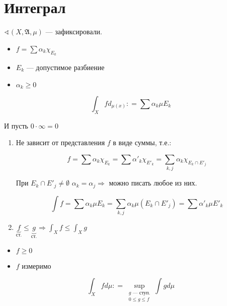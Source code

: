 \section*{Интеграл}

\(\sphericalangle (X, \mathfrak{A}, \mu)\) --- зафиксировали.

\begin{definition}[1]\itemfix
    \begin{itemize}
        \item \(f = \sum \alpha_k \chi_{E_k}\)
        \item \(E_k\) --- допустимое разбиение
        \item \(\alpha_k \geq 0\)
    \end{itemize}

    \[\int_X f d_{\mu(x)} : = \sum \alpha_k \mu E_k\]

    И пусть \(0\cdot \infty = 0\)
\end{definition}

\begin{prop}\itemfix
    \begin{enumerate}
        \item Не зависит от представления \(f\) в виде суммы, т.е.:

              \[f = \sum \alpha_k \chi_{E_k} = \sum \alpha'_k \chi_{E'_k} = \sum_{k, j} \alpha_k \chi_{E_k\cap E'_j}\]

              \begin{remark}
                  При \(E_k \cap E'_j \neq \emptyset\) \(\alpha_k = \alpha_j \Rightarrow \) можно писать любое из них.
              \end{remark}

              \[\int f = \sum \alpha_k \mu E_k = \sum_{k, j} \alpha_k \mu(E_k\cap E'_j) = \sum \alpha'_k \mu E'_k\] %

        \item \(\underbrace{f}_{\text{ст.}} \leq \underbrace{g}_{\text{ст.}} \Rightarrow \int_X f \leq \int_X g\)
    \end{enumerate}
\end{prop}

\begin{definition}[2]\itemfix
    \begin{itemize}
        \item \(f \geq 0\)
        \item \(f\) измеримо
    \end{itemize}
    \[\int_X f d\mu : = \sup_{\substack{g \text{ --- ступ.} \\ 0 \leq g \leq f}} \int g d\mu\]
\end{definition}

